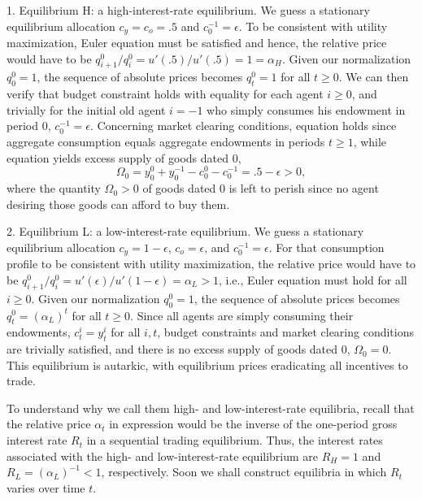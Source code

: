 \medskip
\item{1.}  Equilibrium H: a high-interest-rate
equilibrium.  We guess a stationary equilibrium
allocation $c_y=c_o =.5$ and $c^{-1}_0 = \epsilon$. 
To be consistent with utility maximization, 
Euler equation  must be satisfied
and hence, the relative price would have to be
$q^0_{i+1}/q^0_i = u'(.5)/u'(.5)=1=\alpha_H$. Given our 
normalization $q^0_0=1$, the sequence of absolute 
prices becomes $q_t^0 =1$ for all $t \geq 0$. 
We can then verify that budget constraint 
 holds with equality for each agent 
$i\geq 0$, and trivially for the initial old
agent $i=-1$ who simply consumes his endowment
in period $0$, $c^{-1}_0 =\epsilon$. 
Concerning market clearing conditions,
equation  holds since aggregate
consumption equals aggregate endowments 
in periods $t\geq 1$, while equation 
 yields 
excess supply of goods dated $0$,
$$ \Omega_0 = y^0_0 + y^{-1}_0 
    - c^0_0 - c^{-1}_0 
= .5 - \epsilon > 0,
$$
where the quantity $\Omega_0>0$ of goods 
dated $0$ is left to perish since no agent
desiring those goods can afford to buy them.


\medskip
\item{2.}  Equilibrium L: a low-interest-rate
equilibrium. We guess a stationary equilibrium
allocation $c_y=1-\epsilon$, $c_o =\epsilon$,
and $c^{-1}_0 = \epsilon$. For that consumption
profile to be consistent with utility maximization,
the relative price would have to be
$q^0_{i+1}/q^0_i = u'(\epsilon)/u'(1-\epsilon)
= \alpha_L > 1$, 
i.e., Euler equation  must hold
for all $i\geq 0$. Given our 
normalization $q^0_0=1$, the sequence of absolute 
prices becomes $q_t^0 = (\alpha_L)^t$ for all 
$t \geq 0$. Since all agents are simply 
consuming their endowments, 
$c^i_t = y_t^i$ for all $i, t$, budget constraints
 and market clearing conditions
 are trivially satisfied, and 
there is no excess supply of goods dated $0$,
$\Omega_0=0$. This equilibrium is autarkic,
with equilibrium prices eradicating all incentives 
to trade.


\medskip
\noindent To understand why we call them high- and 
low-interest-rate equilibria, recall that the
relative price $\alpha_t$ in expression
 would be the inverse of the
one-period gross interest rate $R_t$ in a
sequential trading equilibrium. Thus, the
interest rates associated with the high- 
and low-interest-rate equilibrium 
are $R_H=1$ and $R_L=(\alpha_L)^{-1}<1$,
respectively.
Soon we shall construct equilibria in which 
$R_t$ varies over time $t$.



